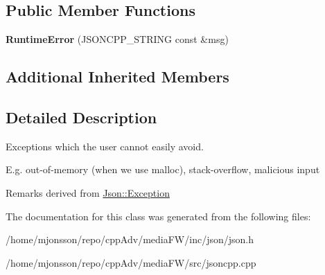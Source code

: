 \subsection*{Public Member Functions}
\begin{DoxyCompactItemize}
\item 
\mbox{\label{classJson_1_1RuntimeError_a0f6445dc345ce0a703610b6e893fee40}} 
{\bfseries Runtime\+Error} (J\+S\+O\+N\+C\+P\+P\+\_\+\+S\+T\+R\+I\+NG const \&msg)
\end{DoxyCompactItemize}
\subsection*{Additional Inherited Members}


\subsection{Detailed Description}
Exceptions which the user cannot easily avoid.

E.\+g. out-\/of-\/memory (when we use malloc), stack-\/overflow, malicious input

\begin{DoxyRemark}{Remarks}
derived from \hyperlink{classJson_1_1Exception}{Json\+::\+Exception} 
\end{DoxyRemark}


The documentation for this class was generated from the following files\+:\begin{DoxyCompactItemize}
\item 
/home/mjonsson/repo/cpp\+Adv/media\+F\+W/inc/json/json.\+h\item 
/home/mjonsson/repo/cpp\+Adv/media\+F\+W/src/jsoncpp.\+cpp\end{DoxyCompactItemize}
